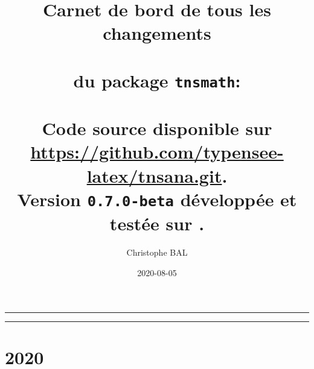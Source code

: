 \documentclass[12pt,a4paper]{book}
\begin{document}
\renewcommand\labelitemi{\raisebox{0.125em}{\tiny\textbullet}}
\renewcommand{\labelitemii}{---}

\title{ %
	Carnet de bord de tous les changements\\%
	\\%
	du package \texttt{tnsmath}:\\%
	\\%
	{\footnotesize Code source disponible sur \url{https://github.com/typensee-latex/tnsana.git}.}%
	\\%
    {\footnotesize Version \texttt{0.7.0-beta} développée et testée sur \macosxname{}.}%
}
\author{Christophe BAL}
\date{2020-08-05}

\maketitle


\vspace{2em}

\hrule

\tableofcontents

\vspace{1.5em}

\hrule

\newpage





\section{2020}
\end{document}
